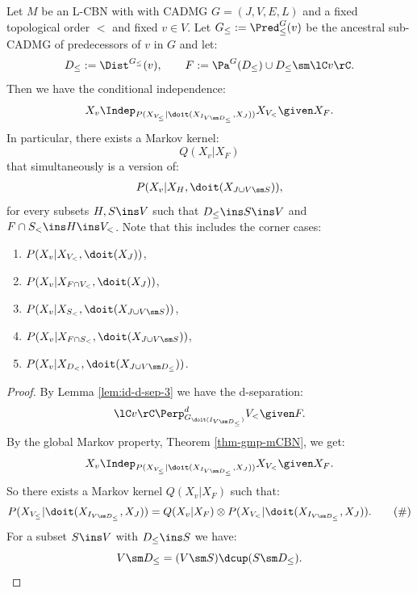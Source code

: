 \begin{Lem}
    \label{lem:int-dist-per-node}
    Let $M$ be an L-CBN with with \observational CADMG $G=(J,V,E,L)$ and a fixed topological order $<$ and fixed $v \in V$.
    Let $G_\le:=\Pred^G_\le(v)$ be the ancestral sub-CADMG of predecessors of $v$ in $G$ and let:
    \[ D_\le := \Dist^{G_\le}(v), \qquad F:= \Pa^G(D_\le) \cup D_\le \sm \lC v \rC. \]
   Then we have the conditional independence:
   \[ X_v \Indep_{P(X_{V_\le}|\doit(X_{I_{V\sm D_\le}},X_J))}  X_{V_<} \given X_F.\]
   In particular, there exists a Markov kernel:
   \[ Q(X_v|X_F) \] 
   that simultaneously is a version of:
   \begin{align*} 
       P(X_v|X_H,\doit(X_{J \cup V\sm S})), 
    \end{align*}
   for every subsets $H,S \ins V$ such that $D_\le \ins S \ins V$ and $F \cap S_< \ins  H \ins V_<$.
  Note that this includes the corner cases: 
  \begin{enumerate}
      \item $P(X_v|X_{V_<},\doit(X_J))$,
      \item $P(X_v|X_{F\cap V_<},\doit(X_J))$,
      \item $P(X_v|X_{S_<},\doit(X_{J \cup V\sm S}))$,
      \item $P(X_v|X_{F \cap S_<},\doit(X_{J \cup V\sm S}))$,
      \item $P(X_v|X_{D_<},\doit(X_{J \cup V\sm D_\le}))$.
  \end{enumerate}
 \begin{proof}
        By Lemma \ref{lem:id-d-sep-3} we have the d-separation:
   \[ \lC v \rC \Perp^d_{G_{\doit( I_{V\sm D_\le} )}} V_< \given F.  \]
   By the global Markov property, Theorem \ref{thm-gmp-mCBN}, we get: 
   \[ X_v \Indep_{P(X_{V_\le}|\doit(X_{I_{V\sm D_\le}},X_J))}  X_{V_<} \given X_F.\]
   So there exists a Markov kernel $Q(X_v|X_F)$ such that:
   \begin{align*}  P(X_{V_\le}|\doit(X_{I_{V\sm D_\le}},X_J)) = Q(X_v|X_F) \otimes P(X_{V_<}|\doit(X_{I_{V\sm D_\le}},X_J)). 
       \label{eq:q-mk-1}\tag{\#}
   \end{align*}
   For a subset $S \ins V$ with $D_\le \ins S$ we have: 
       \[ V\sm D_\le = (V\sm S) \dcup (S\sm D_\le). \] 

\end{proof}
\end{Lem}

